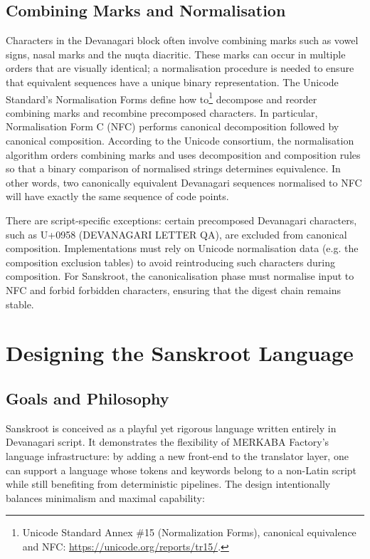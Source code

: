 \documentclass[12pt]{article}
\begin{document}
\subsection{Combining Marks and Normalisation}

Characters in the Devanagari block often involve combining marks such as
vowel signs, nasal marks and the nuqta diacritic.  These marks can occur in
multiple orders that are visually identical; a normalisation procedure is
needed to ensure that equivalent sequences have a unique binary
representation.  The Unicode Standard’s Normalisation Forms define how to\footnote{Unicode Standard Annex \#15 (Normalization Forms), canonical equivalence and NFC: \url{https://unicode.org/reports/tr15/}.}
decompose and reorder combining marks and recombine precomposed characters.
In particular, Normalisation Form C (NFC) performs canonical
decomposition followed by canonical composition.  According to the Unicode
consortium, the normalisation algorithm orders combining marks and uses
decomposition and composition rules so that a binary comparison of
normalised strings determines equivalence.  In other
words, two canonically equivalent Devanagari sequences normalised to NFC
will have exactly the same sequence of code points.

There are script-specific exceptions: certain precomposed Devanagari
characters, such as U+0958  (DEVANAGARI LETTER QA), are
excluded from canonical composition.  Implementations
must rely on Unicode normalisation data (e.g. the composition exclusion
tables) to avoid reintroducing such characters during composition.  For
Sanskroot, the canonicalisation phase must normalise input to NFC and
forbid forbidden characters, ensuring that the digest chain remains stable.

\section{Designing the Sanskroot Language}

\subsection{Goals and Philosophy}

Sanskroot is conceived as a playful yet rigorous language written entirely
in Devanagari script.  It demonstrates the flexibility of MERKABA
Factory’s language infrastructure: by adding a new front-end to the
translator layer, one can support a language whose tokens and keywords
belong to a non-Latin script while still benefiting from deterministic
pipelines.  The design intentionally balances minimalism and maximal
capability:
\end{document}
